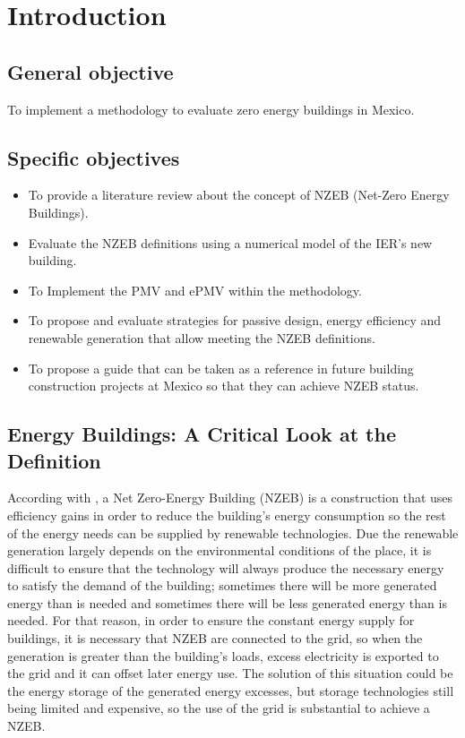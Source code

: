 \chapter{Introduction}
\label{chap:introduccion}

\section{General objective}

To implement a methodology to evaluate zero energy buildings in Mexico.


\section{Specific objectives}

\begin{itemize}

\item To provide a literature review about the concept of NZEB (Net-Zero Energy Buildings).

\item Evaluate the NZEB definitions using a numerical model of the IER's new building.

\item To Implement the PMV and ePMV within the methodology.

\item To propose and evaluate strategies for passive design, energy efficiency and renewable generation that allow meeting the NZEB definitions.

\item To propose a guide that can be taken as a reference in future building construction projects at Mexico  so that they can achieve NZEB status.

\end{itemize}



\section{Energy Buildings: A Critical Look at the Definition}
According with \citep{torcellini2006zero}, a Net Zero-Energy Building (NZEB) is a construction that uses efficiency gains in order to reduce the building's energy consumption so the rest of the energy needs can be supplied by renewable technologies. Due the renewable generation largely depends on the environmental conditions of the place, it is difficult to ensure that the technology will always produce the necessary energy to satisfy the demand of the building; sometimes there will be more generated energy than is needed and sometimes there will be less generated energy than is needed. For that reason, in order to ensure the constant energy supply for buildings, it is necessary that NZEB are connected to the grid, so when the generation is greater than the building's loads, excess electricity is exported to the grid and it can offset later energy use. The solution of this situation could be the energy storage of the generated energy excesses, but storage technologies still being limited and expensive, so the use of the grid is substantial to achieve a NZEB.

